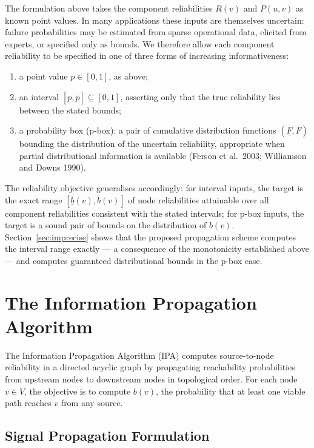 \documentclass[preprint,12pt]{elsarticle}
\theoremstyle{definition}
\begin{document}
The formulation above takes the component reliabilities $R(v)$ and $P(u,v)$ as known point values. In
many applications these inputs are themselves uncertain: failure probabilities may be estimated from
sparse operational data, elicited from experts, or specified only as bounds. We therefore allow each
component reliability to be specified in one of three forms of increasing informativeness:
\begin{enumerate}
\item a point value $p\in[0,1]$, as above;
\item an interval $[\underline{p},\overline{p}]\subseteq[0,1]$, asserting only that the true reliability
lies between the stated bounds;
\item a probability box (p-box): a pair of cumulative distribution functions
$(\underline{F},\overline{F})$ bounding the distribution of the uncertain reliability, appropriate when
partial distributional information is available (Ferson et al.\ 2003; Williamson and Downs 1990).
\end{enumerate}
The reliability objective generalises accordingly: for interval inputs, the target is the exact range
$[\underline{b}(v),\overline{b}(v)]$ of node reliabilities attainable over all component reliabilities
consistent with the stated intervals; for p-box inputs, the target is a sound pair of bounds on the
distribution of $b(v)$. Section~\ref{sec:imprecise} shows that the proposed propagation scheme computes
the interval range exactly --- a consequence of the monotonicity established above --- and computes
guaranteed distributional bounds in the p-box case.

\section{The Information Propagation Algorithm}\label{sec:ipa}

The Information Propagation Algorithm (IPA) computes source-to-node reliability in a directed acyclic
graph by propagating reachability probabilities from upstream nodes to downstream nodes in topological
order. For each node $v\in V$, the objective is to compute $b(v)$, the probability that at least one
viable path reaches $v$ from any source.

\subsection{Signal Propagation Formulation}
\end{document}
